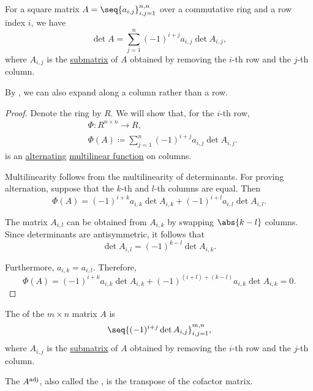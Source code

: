 \begin{theorem}\label{thm:laplace_expansion}
  For a square matrix \( A = \seq{ a_{i,j} }_{i,j=1}^{n,n} \) over a commutative ring and a row index \( i \), we have
  \begin{equation*}
    \det A = \sum_{j=1}^n (-1)^{i + j} a_{i,j} \det A_{i,j},
  \end{equation*}
  where \( A_{i,j} \) is the \hyperref[def:submatrix]{submatrix} of \( A \) obtained by removing the \( i \)-th row and the \( j \)-th column.

  By , we can also expand along a column rather than a row.
\end{theorem}
\begin{proof}
  Denote the ring by \( R \). We will show that, for the \( i \)-th row,
  \begin{equation*}
    \begin{aligned}
      &\Phi: R^{n \times n} \to R, \\
      &\Phi(A) \coloneqq \sum_{j=1}^n (-1)^{i + j} a_{i,j} \det A_{i,j}.
    \end{aligned}
  \end{equation*}
  is an \hyperref[def:alternating_function]{alternating} \hyperref[def:multilinear_function]{multilinear function} on columns.

  Multilinearity follows from the multilinearity of determinants. For proving alternation, suppose that the \( k \)-th and \( l \)-th columns are equal. Then
  \begin{equation*}
    \Phi(A) = (-1)^{i + k} a_{i,k} \det A_{i,k} + (-1)^{i + l} a_{i,l} \det A_{i,l}.
  \end{equation*}

  The matrix \( A_{i,l} \) can be obtained from \( A_{i,k} \) by swapping \( \abs{k - l} \) columns. Since determinants are antisymmetric, it follows that
  \begin{equation*}
    \det A_{i,l} = (-1)^{k - l} \det A_{i,k}.
  \end{equation*}

  Furthermore, \( a_{i,k} = a_{i,l} \). Therefore,
  \begin{equation*}
    \Phi(A) = (-1)^{i + k} a_{i,k} \det A_{i,k} + (-1)^{(i + l) + (k - l)} a_{i,k} \det A_{i,k} = 0.
  \end{equation*}
\end{proof}

\begin{definition}\label{def:adjugate_matrix}\mimprovised
  The  of the \( m \times n \) matrix \( A \) is
  \begin{equation*}
    \seq{ (-1)^{i + j} \det A_{i,j} }_{i,j=1}^{m,n},
  \end{equation*}
  where \( A_{i,j} \) is the \hyperref[def:submatrix]{submatrix} of \( A \) obtained by removing the \( i \)-th row and the \( j \)-th column.

  The  \( A^{\op{adj}} \), also called the , is the transpose of the cofactor matrix.
\end{definition}

